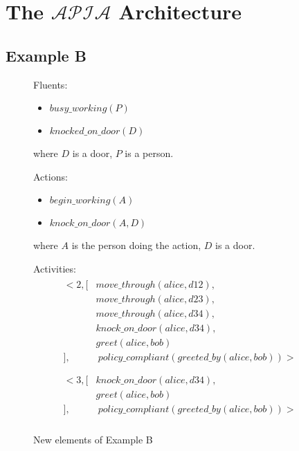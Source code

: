\chapter{The $\mathcal{APIA}$ Architecture}
\label{appendix:apia}

\section{Example B}

\begin{figure}[h]
    \begin{framed}
        Fluents:
        \begin{itemize}
            \item $busy\_working(P)$
            \item $knocked\_on\_door(D)$
        \end{itemize}
        where $D$ is a door, $P$ is a person.

        Actions:
        \begin{itemize}
            \item $begin\_working(A)$
            \item $knock\_on\_door(A, D)$
        \end{itemize}
        where $A$ is the person doing the action, $D$ is a door.

        Activities:
        \begin{gather}
        \begin{split}
            <2, [
                & move\_through(alice, d12), \\
                & move\_through(alice, d23), \\
                & move\_through(alice, d34), \\
                & knock\_on\_door(alice, d34), \\
                & greet(alice, bob) \\
            ], & \ policy\_compliant(greeted\_by(alice, bob))> \\
        \end{split} \\
        \begin{split}
            <3, [
                & knock\_on\_door(alice, d34), \\
                & greet(alice, bob) \\
            ], & \ policy\_compliant(greeted\_by(alice, bob))> \\
        \end{split}
        \end{gather}
    \end{framed}
    \caption{New elements of Example B}
    \label{fig:apia_example_b_description}
\end{figure}

